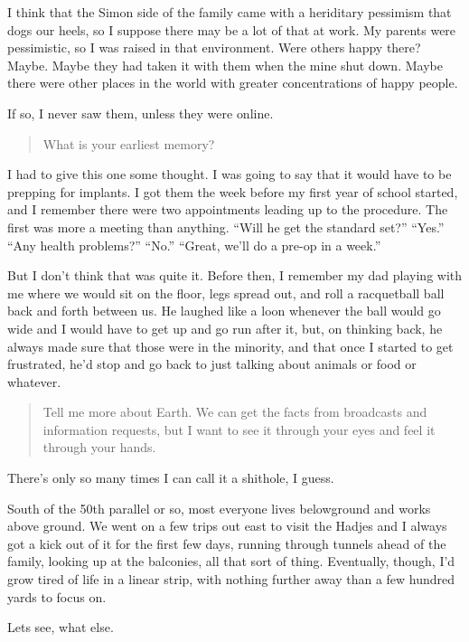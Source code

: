 I think that the Simon side of the family came with a heriditary pessimism that dogs our heels, so I suppose there may be a lot of that at work. My parents were pessimistic, so I was raised in that environment. Were others happy there? Maybe. Maybe they had taken it with them when the mine shut down. Maybe there were other places in the world with greater concentrations of happy people.

If so, I never saw them, unless they were online.

\begin{quote}
What is your earliest memory?
\end{quote}

\noindent I had to give this one some thought. I was going to say that it would have to be prepping for implants. I got them the week before my first year of school started, and I remember there were two appointments leading up to the procedure. The first was more a meeting than anything. ``Will he get the standard set?'' ``Yes.'' ``Any health problems?'' ``No.'' ``Great, we'll do a pre-op in a week.''

But I don't think that was quite it. Before then, I remember my dad playing with me where we would sit on the floor, legs spread out, and roll a racquetball ball back and forth between us. He laughed like a loon whenever the ball would go wide and I would have to get up and go run after it, but, on thinking back, he always made sure that those were in the minority, and that once I started to get frustrated, he'd stop and go back to just talking about animals or food or whatever.

\begin{quote}
Tell me more about Earth. We can get the facts from broadcasts and information requests, but I want to see it through your eyes and feel it through your hands.
\end{quote}

\noindent There's only so many times I can call it a shithole, I guess.

South of the 50th parallel or so, most everyone lives belowground and works above ground. We went on a few trips out east to visit the Hadjes and I always got a kick out of it for the first few days, running through tunnels ahead of the family, looking up at the balconies, all that sort of thing. Eventually, though, I'd grow tired of life in a linear strip, with nothing further away than a few hundred yards to focus on.

Lets see, what else.

